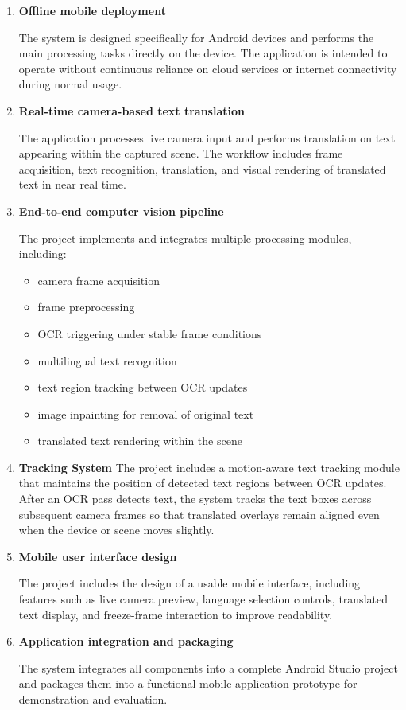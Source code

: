 \begin{enumerate}

    \item \textbf{Offline mobile deployment}

    The system is designed specifically for Android devices and performs the main processing tasks directly on the device. The application is intended to operate without continuous reliance on cloud services or internet connectivity during normal usage.

    \item \textbf{Real-time camera-based text translation}

    The application processes live camera input and performs translation on text appearing within the captured scene. The workflow includes frame acquisition, text recognition, translation, and visual rendering of translated text in near real time.

    \item \textbf{End-to-end computer vision pipeline}

    The project implements and integrates multiple processing modules, including:
    
    \begin{itemize}
        \item camera frame acquisition
        \item frame preprocessing
        \item OCR triggering under stable frame conditions
        \item multilingual text recognition
        \item text region tracking between OCR updates
        \item image inpainting for removal of original text
        \item translated text rendering within the scene
    \end{itemize}

    \item \textbf{Tracking System}
      The project includes a motion-aware text tracking module that maintains the position of detected text regions between OCR updates. After an OCR pass detects text, the system tracks the text boxes across subsequent camera frames so that translated overlays remain aligned even when the device or scene moves slightly.    

    \item \textbf{Mobile user interface design}

    The project includes the design of a usable mobile interface, including features such as live camera preview, language selection controls, translated text display, and freeze-frame interaction to improve readability.

    \item \textbf{Application integration and packaging}

    The system integrates all components into a complete Android Studio project and packages them into a functional mobile application prototype for demonstration and evaluation.

\end{enumerate}

